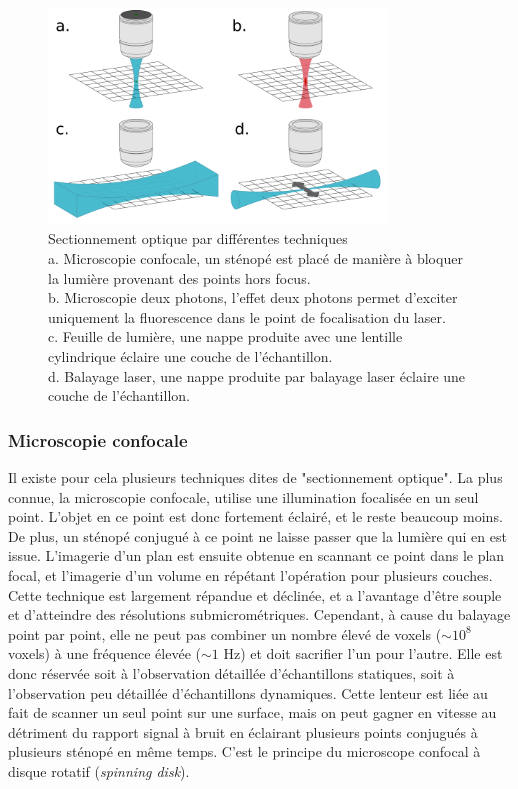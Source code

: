 \begin{figure}
  \centering
  \includegraphics[width=0.8\textwidth]{./files/optical_sectionning.svg.png}
  \caption{Sectionnement optique par différentes techniques \\
  a. Microscopie confocale, un sténopé est placé de manière à bloquer la lumière provenant des points hors focus. \\
  b. Microscopie deux photons, l'effet deux photons permet d'exciter uniquement la fluorescence dans le point de focalisation du laser. \\
  c. Feuille de lumière, une nappe produite avec une lentille cylindrique éclaire une couche de l'échantillon. \\
  d. Balayage laser, une nappe produite par balayage laser éclaire une couche de l'échantillon. \\
  }
  \end{figure}

\subsubsection{Microscopie confocale}

Il existe pour cela plusieurs techniques dites de "sectionnement optique". La plus connue, la microscopie confocale, utilise une illumination focalisée en un seul point. L'objet en ce point est donc fortement éclairé, et le reste beaucoup moins. De plus, un sténopé conjugué à ce point ne laisse passer que la lumière qui en est issue. L'imagerie d'un plan est ensuite obtenue en scannant ce point dans le plan focal, et l'imagerie d'un volume en répétant l'opération pour plusieurs couches. Cette technique est largement répandue et déclinée, et a l'avantage d'être souple et d'atteindre des résolutions submicrométriques. Cependant, à cause du balayage point par point, elle ne peut pas combiner un nombre élevé de voxels ($\sim 10^8$ voxels) à une fréquence élevée ($\sim 1$ Hz) et doit sacrifier l'un pour l'autre. Elle est donc réservée soit à l'observation détaillée d'échantillons statiques, soit à l'observation peu détaillée d'échantillons dynamiques. Cette lenteur est liée au fait de scanner un seul point sur une surface, mais on peut gagner en vitesse au détriment du rapport signal à bruit en éclairant plusieurs points conjugués à plusieurs sténopé en même temps. C'est le principe du microscope confocal à disque rotatif (\emph{spinning disk}).


